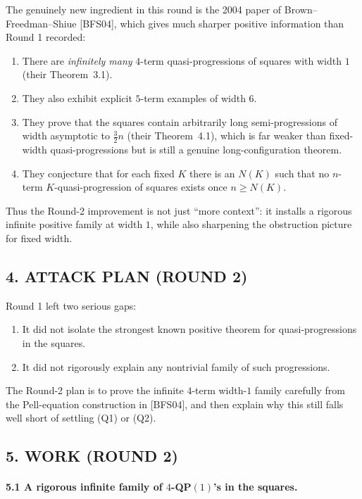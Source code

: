 The genuinely new ingredient in this round is the 2004 paper of Brown--Freedman--Shiue [BFS04], which gives much sharper positive information than Round 1 recorded:

\begin{enumerate}
\item There are \emph{infinitely many} $4$-term quasi-progressions of squares with width $1$ (their Theorem~3.1).
\item They also exhibit explicit $5$-term examples of width $6$.
\item They prove that the squares contain arbitrarily long semi-progressions of width asymptotic to $\frac{3}{2}n$ (their Theorem~4.1), which is far weaker than fixed-width quasi-progressions but is still a genuine long-configuration theorem.
\item They conjecture that for each fixed $K$ there is an $N(K)$ such that no $n$-term $K$-quasi-progression of squares exists once $n \geq N(K)$.
\end{enumerate}

Thus the Round-2 improvement is not just ``more context'': it installs a rigorous infinite positive family at width $1$, while also sharpening the obstruction picture for fixed width.

\subsection*{4. ATTACK PLAN (ROUND 2)}

Round 1 left two serious gaps:

\begin{enumerate}
\item It did not isolate the strongest known positive theorem for quasi-progressions in the squares.
\item It did not rigorously explain any nontrivial family of such progressions.
\end{enumerate}

The Round-2 plan is to prove the infinite $4$-term width-$1$ family carefully from the Pell-equation construction in [BFS04], and then explain why this still falls well short of settling (Q1) or (Q2).

\subsection*{5. WORK (ROUND 2)}

\paragraph{5.1 A rigorous infinite family of $4$-QP$(1)$'s in the squares.}

